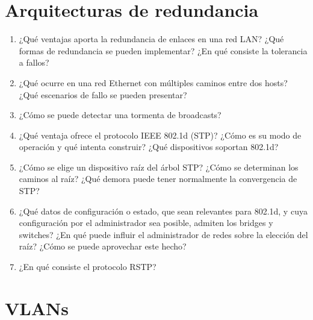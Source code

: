 \section{Arquitecturas de redundancia}
\begin{enumerate}
\item ¿Qué ventajas aporta la redundancia de enlaces en una red LAN? ¿Qué formas de redundancia se pueden implementar? ¿En qué consiste la tolerancia a fallos?
\item ¿Qué ocurre en una red Ethernet con múltiples caminos entre dos hosts? ¿Qué escenarios de fallo se pueden presentar?  
\item ¿Cómo se puede detectar una tormenta de broadcasts?
\item ¿Qué ventaja ofrece el protocolo IEEE 802.1d (STP)? ¿Cómo es su modo de operación y qué intenta construir? ¿Qué dispositivos soportan 802.1d? 
\item ¿Cómo se elige un dispositivo raíz del árbol STP? ¿Cómo se determinan los caminos al raíz? ¿Qué demora puede tener normalmente la convergencia de STP?
\item ¿Qué datos de configuración o estado, que sean relevantes para 802.1d, y cuya configuración por el administrador sea posible, admiten los bridges y switches? ¿En qué puede influir el administrador de redes sobre la elección del raíz? ¿Cómo se puede aprovechar este hecho?
\item ¿En qué consiste el protocolo RSTP?
\end{enumerate}



\section{VLANs}
\label{sub:}





